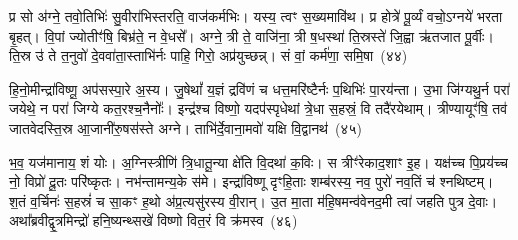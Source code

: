 {\anuvakamend[{र॒क्ष॒स्व॒ भ्रातृ॑व्य॒स्त्रयो॑दश च}]}%

प्र सो अ॑ग्ने॒ तवो॒तिभिः॑ सु॒वीरा॑भिस्तरति॒ वाज॑कर्मभिः। यस्य॒ त्वꣳ स॒ख्यमावि॑थ। प्र होत्रे॑ पू॒र्व्यं वचो॒\-ऽग्नये॑ भरता बृ॒हत्। वि॒पां ज्योतीꣳ॑षि॒ बिभ्र॑ते॒ न वे॒धसे᳚। अग्ने॒ त्री ते॒ वाजि॑ना॒ त्री ष॒धस्था॑ ति॒स्रस्ते॑ जि॒ह्वा ऋ॑तजात पू॒र्वीः। ति॒स्र उ॑ ते त॒नुवो॑ दे॒ववा॑ता॒स्ताभि॑र्नः पाहि॒ गिरो॒ अप्र॑युच्छन्न्। सं वां॒ कर्म॑णा॒ समि॒षा~(४४)

हि॒नो॒मीन्द्रा॑विष्णू॒ अप॑सस्पा॒रे अ॒स्य। जु॒षेथां᳚ य॒ज्ञं द्रवि॑णं च धत्त॒मरि॑ष्टैर्नः प॒थिभिः॑ पा॒रय॑न्ता। उ॒भा जि॑ग्यथु॒र्न परा॑ जयेथे॒ न परा॑ जिग्ये कत॒रश्च॒नैनोः᳚। इन्द्र॑श्च विष्णो॒ यदप॑स्पृधेथां त्रे॒धा स॒हस्रं॒ वि तदै॑रयेथाम्। त्रीण्यायूꣳ॑षि॒ तव॑ जातवेदस्ति॒स्र आ॒जानी॑रु॒षस॑स्ते अग्ने। ताभि॑र्दे॒वाना॒मवो॑ यक्षि वि॒द्वानथ॑~(४५)

भ॒व॒ यज॑मानाय॒ शं योः। अ॒ग्निस्त्रीणि॑ त्रि॒धातू॒न्या क्षे॑ति वि॒दथा॑ क॒विः। स त्रीꣳ॑रेकाद॒शाꣳ इ॒ह। यक्ष॑च्च पि॒प्रय॑च्च नो॒ विप्रो॑ दू॒तः परि॑ष्कृतः। नभ॑न्तामन्य॒के स॑मे। इन्द्रा॑विष्णू दृꣳहि॒ताः शम्ब॑रस्य॒ नव॒ पुरो॑ नव॒तिं च॑ श्नथिष्टम्। श॒तं व॒र्चिनः॑ स॒हस्रं॑ च सा॒कꣳ ह॒थो अ॑प्र॒त्यसु॑रस्य वी॒रान्। उ॒त मा॒ता म॑हि॒षमन्व॑वेनद॒मी त्वा॑ जहति पुत्र दे॒वाः। अथा᳚ब्रवीद्वृ॒त्रमिन्द्रो॑ हनि॒ष्यन्थ्सखे॑ विष्णो वित॒रं वि क्र॑मस्व~(४६)


{\anuvakamend[{इ॒षा\-ऽथ॑ त्वा॒ त्रयो॑दश च}]}%

{\prashnaend[{यो वै स्फ्यः स्व॒स्तिः स्व॒धायै॒ नमः॒ प्र मु़॑ञ्च॒ तिष्ठ॑तीव॒ षट्च॑त्वारिꣳशत्॥46॥ यो वै पव॑मानानां॒ वि क्र॑मस्व॥}]}
